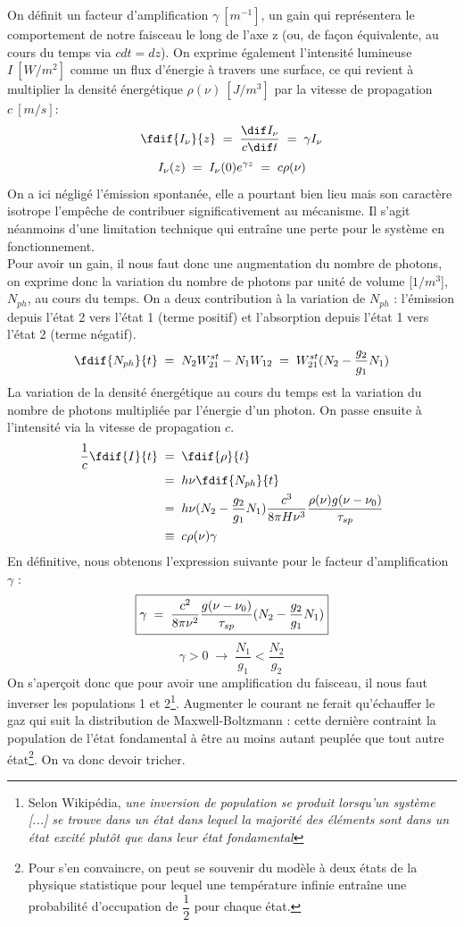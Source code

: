 On définit un facteur d'amplification $\gamma\ [m^{-1}]$, un gain qui représentera le comportement de notre faisceau le long de l'axe z (ou, de façon équivalente, au cours du temps via $cdt = dz$). On exprime également l'intensité lumineuse $I\ [W/m^2]$ comme un flux d'énergie à travers une surface, ce qui revient à multiplier la densité énergétique $\rho(\nu)\ [J/m^3]$ par la vitesse de propagation $c\ [m/s]$:
\[
    \fdif{I_\nu}{z} \eq \dfrac{\dif I_\nu}{c\dif t} \eq \gamma I_\nu
\]
\[
    I_\nu(z) \; = \; I_\nu(0) e^{\gamma z} \; = \; c\rho(\nu)
\]
On a ici négligé l'émission spontanée, elle a pourtant bien lieu mais son caractère isotrope l'empêche de contribuer significativement au mécanisme. Il s'agit néanmoins d'une limitation technique qui entraîne une perte pour le système en fonctionnement.\\
Pour avoir un gain, il nous faut donc une augmentation du nombre de photons, on exprime donc la variation du nombre de photons par unité de volume [$1/m^3$], $N_{ph}$, au cours du temps. On a deux contribution à la variation de $N_{ph}$ : l'émission depuis l'état 2 vers l'état 1 (terme positif) et l'absorption depuis l'état 1 vers l'état 2 (terme négatif).
\[
    \fdif{N_{ph}}{t} 
    \eq N_2 W_{21}^{st} - N_1 W_{12}
    \eq W_{21}^{st} (N_2 - \dfrac{g_2}{g_1}N_1)
\]
La variation de la densité énergétique au cours du temps est la variation du nombre de photons multipliée par l'énergie d'un photon. On passe ensuite à l'intensité via la vitesse de propagation $c$.
\begin{align*}
    \dfrac{1}{c}\fdif{I}{t}
    &\eq  \fdif{\rho}{t}\\
    &\eq  h\nu\fdif{N_{ph}}{t}\\
    &\eq  h\nu (N_2 - \dfrac{g_2}{g_1}N_1) \dfrac{c^3}{8\pi H \nu^3}\dfrac{\rho(\nu) g(\nu - \nu_0)}{\tau_{sp}}\\
    &\;\equiv\;  c\rho(\nu)\gamma
\end{align*}
En définitive, nous obtenons l'expression suivante pour le facteur d'amplification $\gamma$ :
\begin{equation}
    \boxed{
        \gamma \; = \; \dfrac{c^2}{8\pi\nu^2}\dfrac{g(\nu - \nu_0)}{\tau_{sp}}(N_2 - \dfrac{g_2}{g_1}N_1)
    }
\end{equation}
\[
\boxed{
    \gamma > 0 \; \longrightarrow \; \dfrac{N_1}{g_1} < \dfrac{N_2}{g_2}
    }
\]
On s'aperçoit donc que pour avoir une amplification du faisceau, il nous faut inverser les populations 1 et 2\footnote{Selon Wikipédia, \textit{une inversion de population se produit lorsqu'un système [...] se trouve dans un état dans lequel la majorité des éléments sont dans un état excité plutôt que dans leur état fondamental}}. Augmenter le courant ne ferait qu'échauffer le gaz qui suit la distribution de Maxwell-Boltzmann : cette dernière contraint la population de l'état fondamental à être au moins autant peuplée que tout autre état\footnote{Pour s'en convaincre, on peut se souvenir du modèle à deux états de la physique statistique pour lequel une température infinie entraîne une probabilité d'occupation de $\dfrac{1}{2}$ pour chaque état.}. On va donc devoir tricher.


